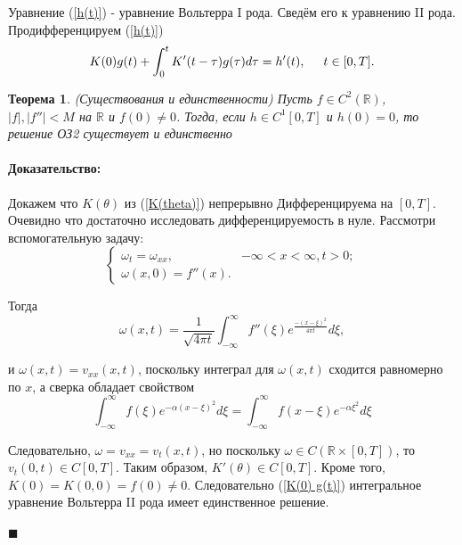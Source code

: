 \documentclass{article}
\newtheorem{theorem}{Теорема}
\newenvironment{proof}{\paragraph{Доказательство:}}{\hfill$\blacksquare$}
\begin{document}
Уравнение (\ref{h(t)}) - уравнение Вольтерра I рода. 
Сведём его к уравнению II рода.
Продифференцируем (\ref{h(t)})
\begin{equation}
	K(0) g(t) + \int_0^t K'(t-\tau) g(\tau) d \tau = h'(t), 
	\hspace{0.5cm} t \in [0,T].
	\label{K(0) g(t)}
\end{equation}

\begin{theorem}
	(Существования и единственности)
	Пусть $f \in C^2(\mathbb{R})$, $|f|, |f''| < M$ на $\mathbb{R}$ и $f(0) \neq 0$.
	Тогда, если $h \in C^1[0,T]$ и $h(0) = 0$, то решение ОЗ2 существует и единственно
\end{theorem}
\begin{proof}

Докажем что $K(\theta)$ из (\ref{K(theta)}) непрерывно Дифференцируема на $[0,T]$. 
Очевидно что достаточно исследовать дифференцируемость в нуле. 
Рассмотри вспомогательную задачу:
\begin{equation*}
\begin{cases}
	\omega_t = \omega_{xx},& -\infty < x < \infty, t> 0;\\
	\omega(x,0) = f''(x).
\end{cases}
\end{equation*}

Тогда 
\begin{equation*}
	\omega(x,t) = \dfrac{1}{\sqrt{4 \pi t}} \int_{-\infty}^{\infty} f''(\xi) e^{\frac{-(x-\xi)^2}{4 \pi t}} d\xi,
\end{equation*}

и $\omega(x,t) = v_{xx} (x,t)$, поскольку интеграл для $\omega(x,t)$ сходится равномерно по $x$, а сверка обладает свойством 
\begin{equation*}
	\int_{-\infty}^{\infty} f(\xi) e^{-\alpha(x - \xi)^2} d\xi = 
	\int_{-\infty}^{\infty} f(x -\xi) e^{-\alpha \xi^2} d\xi
\end{equation*}

Следовательно, $\omega = v_{xx} = v_t(x,t)$, но поскольку $\omega \in C(\mathbb{R} \times [0,T])$, то $v_t(0,t) \in C[0,T]$.
Таким образом, $K'(\theta) \in C[0,T] $. Кроме того, $K(0) = K(0,0) = f(0) \neq 0$. 
Следовательно (\ref{K(0) g(t)}) интегральное уравнение Вольтерра II рода имеет единственное решение.

\end{proof}
\end{document}
